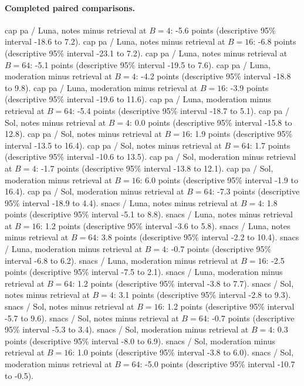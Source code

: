 \paragraph{Completed paired comparisons.}
cap pa / Luna, notes minus retrieval at $B=4$: -5.6 points (descriptive 95\% interval -18.6 to 7.2).
cap pa / Luna, notes minus retrieval at $B=16$: -6.8 points (descriptive 95\% interval -23.1 to 7.2).
cap pa / Luna, notes minus retrieval at $B=64$: -5.1 points (descriptive 95\% interval -19.5 to 7.6).
cap pa / Luna, moderation minus retrieval at $B=4$: -4.2 points (descriptive 95\% interval -18.8 to 9.8).
cap pa / Luna, moderation minus retrieval at $B=16$: -3.9 points (descriptive 95\% interval -19.6 to 11.6).
cap pa / Luna, moderation minus retrieval at $B=64$: -5.4 points (descriptive 95\% interval -18.7 to 5.1).
cap pa / Sol, notes minus retrieval at $B=4$: 0.0 points (descriptive 95\% interval -15.8 to 12.8).
cap pa / Sol, notes minus retrieval at $B=16$: 1.9 points (descriptive 95\% interval -13.5 to 16.4).
cap pa / Sol, notes minus retrieval at $B=64$: 1.7 points (descriptive 95\% interval -10.6 to 13.5).
cap pa / Sol, moderation minus retrieval at $B=4$: -1.7 points (descriptive 95\% interval -13.8 to 12.1).
cap pa / Sol, moderation minus retrieval at $B=16$: 6.0 points (descriptive 95\% interval -1.9 to 16.4).
cap pa / Sol, moderation minus retrieval at $B=64$: -7.3 points (descriptive 95\% interval -18.9 to 4.4).
snacs / Luna, notes minus retrieval at $B=4$: 1.8 points (descriptive 95\% interval -5.1 to 8.8).
snacs / Luna, notes minus retrieval at $B=16$: 1.2 points (descriptive 95\% interval -3.6 to 5.8).
snacs / Luna, notes minus retrieval at $B=64$: 3.8 points (descriptive 95\% interval -2.2 to 10.4).
snacs / Luna, moderation minus retrieval at $B=4$: -0.7 points (descriptive 95\% interval -6.8 to 6.2).
snacs / Luna, moderation minus retrieval at $B=16$: -2.5 points (descriptive 95\% interval -7.5 to 2.1).
snacs / Luna, moderation minus retrieval at $B=64$: 1.2 points (descriptive 95\% interval -3.8 to 7.7).
snacs / Sol, notes minus retrieval at $B=4$: 3.1 points (descriptive 95\% interval -2.8 to 9.3).
snacs / Sol, notes minus retrieval at $B=16$: 1.2 points (descriptive 95\% interval -5.7 to 9.6).
snacs / Sol, notes minus retrieval at $B=64$: -0.7 points (descriptive 95\% interval -5.3 to 3.4).
snacs / Sol, moderation minus retrieval at $B=4$: 0.3 points (descriptive 95\% interval -8.0 to 6.9).
snacs / Sol, moderation minus retrieval at $B=16$: 1.0 points (descriptive 95\% interval -3.8 to 6.0).
snacs / Sol, moderation minus retrieval at $B=64$: -5.0 points (descriptive 95\% interval -10.7 to -0.5).
